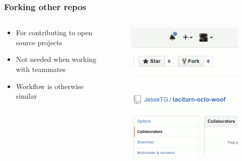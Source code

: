 \documentclass[glossy]{beamer}
\begin{document}
\begin{frame}[fragile=singleslide]
  \frametitle{Forking other repos}

  \begin{columns}[t]
    \begin{column}{6cm}
      \begin{itemize}
        \item For contributing to open source projects
        \item Not needed when working with teammates
        \item Workflow is otherwise similar
      \end{itemize}
    \end{column}

    \begin{column}{6cm}
      \begin{figure}
        \centering
        \includegraphics[width=0.9\columnwidth]{fork}
      \end{figure}

      \begin{figure}
        \centering
        \includegraphics[width=0.9\columnwidth]{collaborators}
      \end{figure}
    \end{column}
  \end{columns}

\end{frame}
\end{document}
